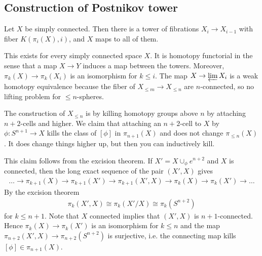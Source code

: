 \documentclass[12pt]{article}
\begin{document}
\subsection{Construction of Postnikov tower}
Let $X$ be simply connected. Then there is a tower of fibrations $X_i \to X_{i-1}$ with fiber $K(\pi_i(X),i)$, and $X$ maps to all of them.

\begin{theorem}
    This exists for every simply connected space $X$. It is homotopy functorial in the sense that a map $X \to Y$ induces a map between the towers. Moreover, $\pi_k(X)\to \pi_k(X_i)$ is an isomorphism for $k \le i$. The map $X \to \varprojlim X_i$ is a weak homotopy equivalence because the fiber of $X_{\leq m} \to X_{\leq n}$ are $n$-connected, so no lifting problem for $\leq n$-spheres.
\end{theorem}

The construction of $X_{\leq n}$ is by killing homotopy groups above $n$ by attaching $n+2$-cells and higher. We claim that attaching an $n+2$-cell to $X$ by $\phi:S^{n+1}\to X$ kills the class of $[\phi]$ in $\pi_{n+1}(X)$ and does not change $\pi_{\leq n}(X)$. It does change things higher up, but then you can inductively kill.

This claim follows from the excision theorem. If $X' = X \cup_\phi e^{n+2}$ and $X$ is connected, then the long exact sequence of the pair $(X',X)$ gives 
\begin{align*}
    \dots \to \pi_{k+1}(X) \to \pi_{k+1}(X') \to \pi_{k+1}(X',X) \to \pi_k(X) \to \pi_k(X') \to \dots
\end{align*} By the excision theorem \begin{align*}
    \pi_k(X',X) \cong \pi_k(X'/X) \cong \pi_k(S^{n+2})
\end{align*} for $k \leq n+1$. Note that $X$ connected implies that $(X',X)$ is $n+1$-connected. Hence $\pi_k(X) \to \pi_k(X')$ is an isomorphism for $k \leq n$ and the map $\pi_{n+2}(X',X) \to \pi_{n+2}(S^{n+2})$ is surjective, i.e. the connecting map kills $[\phi] \in \pi_{n+1}(X)$.
\end{document}
